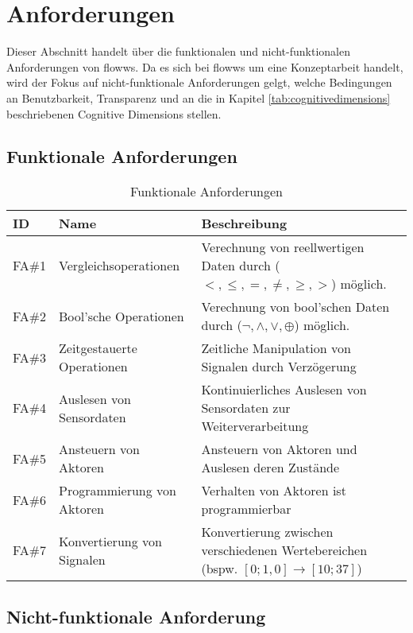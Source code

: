 \section{Anforderungen}
Dieser Abschnitt handelt über die funktionalen und nicht-funktionalen Anforderungen von flowws. Da es sich bei flowws um eine Konzeptarbeit handelt, wird der Fokus auf nicht-funktionale Anforderungen gelgt, welche Bedingungen an Benutzbarkeit, Transparenz und an die in Kapitel \ref{tab:cognitivedimensions} beschriebenen Cognitive Dimensions stellen. 

\subsection{Funktionale Anforderungen}\label{subsec:fanf}
\begin{table}[H]
\caption{Funktionale Anforderungen}
\label{tab:fanf}
\begin{tabularx}{\textwidth}{llX}
\hline
\rowcolor[HTML]{EFEFEF}
ID    & Name                       & Beschreibung \\ \hline
FA\#1 & Vergleichsoperationen      & Verechnung von reellwertigen Daten durch ($<,\leq,=,\neq,\geq,>$) möglich. \\ \hline
FA\#2 & Bool'sche Operationen      & Verechnung von bool'schen Daten durch ($\neg, \land, \lor, \oplus$) möglich. \\ \hline
FA\#3 & Zeitgestauerte Operationen & Zeitliche Manipulation von Signalen durch Verzögerung \\ \hline
FA\#4 & Auslesen von Sensordaten   & Kontinuierliches Auslesen von Sensordaten zur Weiterverarbeitung \\ \hline
FA\#5 & Ansteuern von Aktoren      & Ansteuern von Aktoren und Auslesen deren Zustände \\ \hline
FA\#6 & Programmierung von Aktoren & Verhalten von Aktoren ist programmierbar \\ \hline
FA\#7 & Konvertierung von Signalen & Konvertierung zwischen verschiedenen Wertebereichen (bspw. $\left [ 0;1,0 \right ] \rightarrow \left [ 10;37 \right ]$) \\ \hline
\end{tabularx}
\end{table}

\subsection{Nicht-funktionale Anforderung}

